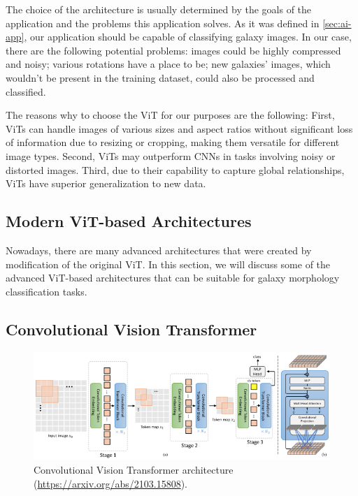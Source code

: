The choice of the architecture is usually determined by the goals of the application and the problems this application solves. As it was defined in \autoref{sec:ai-app}, our application should be capable of classifying galaxy images. In our case, there are the following potential problems: images could be highly compressed and noisy; various rotations have a place to be; new galaxies' images, which wouldn't be present in the training dataset, could also be processed and classified. 

\medskip

The reasons why to choose the ViT for our purposes are the following: First, ViTs can handle images of various sizes and aspect ratios without significant loss of information due to resizing or cropping, making them versatile for different image types. Second, ViTs may outperform CNNs in tasks involving noisy or distorted images. Third, due to their capability to capture global relationships, ViTs have superior generalization to new data.

\subsection*{Modern ViT-based Architectures}

Nowadays, there are many advanced architectures that were created by modification of the original ViT. In this section, we will discuss some of the advanced ViT-based architectures that can be suitable for galaxy morphology classification tasks. 

\subsection*{Convolutional Vision Transformer}

\begin{figure}[htbp]
    \centering
    \includegraphics[width=0.8\linewidth]{obrazky-figures/02-theoretical-basis/cvt.png}
    \caption{Convolutional Vision Transformer architecture (\url{https://arxiv.org/abs/2103.15808}).}
    \label{fig:cvt}
\end{figure}

